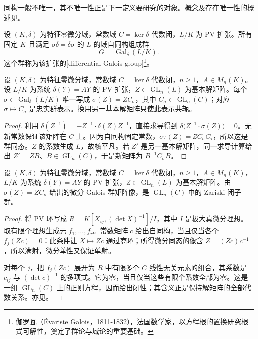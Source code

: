 同构一般不唯一，其不唯一性正是下一定义要研究的对象。概念及存在唯一性的概述见\cite[Definition 1.3.2 and the following discussion, pp. 10--11]{Singer2009DifferentialGalois}。

\begin{definition}\label{b5:def:E-galois-group}
	设 \((K,\delta)\) 为特征零微分域，常数域 \(C=\ker\delta\) 代数闭，\(L/K\) 为 PV 扩张。所有固定 \(K\) 且满足 \(\sigma\delta=\delta\sigma\) 的 \(L\) 的域自同构组成群
	\[
		G=\operatorname{Gal}_{\delta}(L/K).
	\]
	这个群称为该扩张的[differential Galois group]\footnote{伽罗瓦（Évariste Galois，1811-1832），法国数学家，以方程根的置换研究根式可解性，奠定了群论与域论的重要基础。}。
\end{definition}

\begin{proposition}\label{b5:prop:E-group-matrix}
	设 \((K,\delta)\) 为特征零微分域，常数域 \(C=\ker\delta\) 代数闭，\(n\ge1\)，\(A\in M_n(K)\)。设 \(L/K\) 为系统 \(\delta(Y)=AY\) 的 PV 扩张，\(Z\in\operatorname{GL}_n(L)\) 为基本解矩阵。每个 \(\sigma\in\operatorname{Gal}_\delta(L/K)\) 唯一写成 \(\sigma(Z)=ZC_\sigma\)，其中 \(C_\sigma\in\operatorname{GL}_n(C)\)；对应 \(\sigma\mapsto C_\sigma\) 是忠实群表示。换用另一基本解矩阵只使此表示共轭。
\end{proposition}
\begin{proof}
	利用 \(\delta(Z^{-1})=-Z^{-1}\cdot\delta(Z)Z^{-1}\)，直接求导得到 \(\delta\bigl(Z^{-1}\cdot\sigma(Z)\bigr)=0\)。无新常数保证该矩阵在 \(C\) 上。因为自同构固定常数，\(\sigma\tau(Z)=ZC_\sigma C_\tau\)，所以这是群同态。\(Z\) 的系数生成 \(L\)，故核平凡。若 \(Z'\) 是另一基本解矩阵，同一求导计算给出 \(Z'=ZB\)、\(B\in\operatorname{GL}_n(C)\)，于是新矩阵为 \(B^{-1}C_\sigma B\)。
\end{proof}

\begin{corollary}\label{b5:cor:E-group-closed}
	设 \((K,\delta)\) 为特征零微分域，常数域 \(C=\ker\delta\) 代数闭，\(n\ge1\)，\(A\in M_n(K)\)，\(L/K\) 为系统 \(\delta(Y)=AY\) 的 PV 扩张，\(Z\in\operatorname{GL}_n(L)\) 为基本解矩阵。由 \(\sigma(Z)=ZC_\sigma\) 给出的微分 Galois 群矩阵像，是 \(\operatorname{GL}_n(C)\) 中的 Zariski 闭子群。
\end{corollary}
\begin{proof}
	将 PV 环写成 \(R=K[X_{ij},(\det X)^{-1}]/I\)，其中 \(I\) 是极大真微分理想。取有限个理想生成元 \(f_1,\ldots,f_r\)。常数矩阵 \(c\) 给出自同构，当且仅当各个 \(f_j(Zc)=0\)：此条件让 \(X\mapsto Zc\) 通过商环；所得微分同态的像含 \(Z=(Zc)c^{-1}\)，所以满射，微分单性又保证单射。

	对每个 \(j\)，把 \(f_j(Zc)\) 展开为 \(R\) 中有限多个 \(C\) 线性无关元素的组合，其系数是 \(c_{ij}\) 与 \((\det c)^{-1}\) 的多项式。它为零，当且仅当这些有限个系数全部为零。这是一组 \(\operatorname{GL}_n(C)\) 上的正则方程，因而给出闭性；其含义正是保持解矩阵的全部代数关系。亦见\cite[Proposition 1.3.6, p. 12]{Singer2009DifferentialGalois}。
\end{proof}

